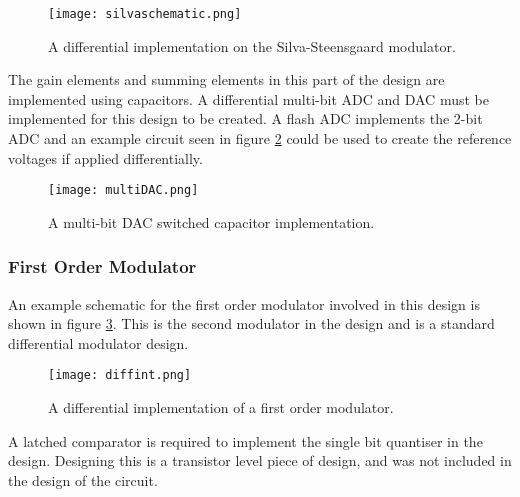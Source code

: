         \begin{figure}
            \begin{center}
            \texttt{[image: silvaschematic.png]}
            \label{fig:silvaschematic}
            \caption{A differential implementation on the Silva-Steensgaard modulator.}
            \end{center}
        \end{figure}

        The gain elements and summing elements in this part of the design are implemented using capacitors.
        A differential multi-bit ADC and DAC must be implemented for this design to be created.
        A flash ADC implements the 2-bit ADC and an example circuit seen in figure \ref{fig:multiDAC} could be used to create the reference voltages if applied differentially.

        \begin{figure}
            \begin{center}
            \texttt{[image: multiDAC.png]}
            \label{fig:multiDAC}
            \caption{A multi-bit DAC switched capacitor implementation\cite{Henderson2013a}.}
            \end{center}
        \end{figure}       

        \subsubsection{First Order Modulator}
        An example schematic for the first order modulator involved in this design is shown in figure \ref{fig:diffint}.
        This is the second modulator in the design and is a standard differential modulator design.

        \begin{figure}
            \begin{center}
            \texttt{[image: diffint.png]}
            \label{fig:diffint}
            \caption{A differential implementation of a first order modulator\cite{Henderson2013a}.}
            \end{center}
        \end{figure}

        A latched comparator is required to implement the single bit quantiser in the design.
        Designing this is a transistor level piece of design, and was not included in the design of the circuit.

